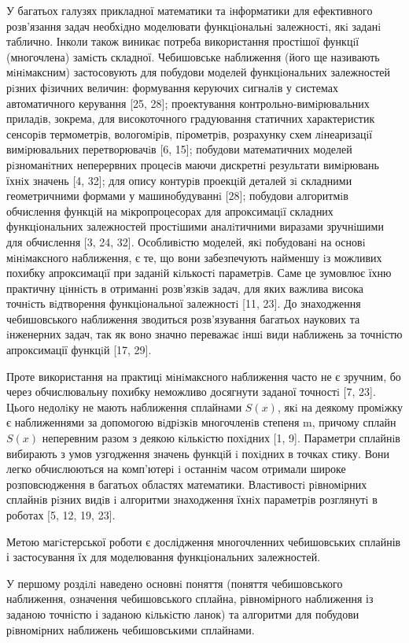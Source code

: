 \documentclass[ukrainian,14pt]{extarticle}
\begin{document}
У багатьох галузях прикладної математики та iнформатики для
ефективного розв’язання задач необхiдно моделювати функцiональнi
залежностi, якi заданi таблично. Інколи також виникає потреба
використання простішої функцiї (многочлена) замiсть складної.
Чебишовське наближення (його ще називають мiнiмаксним) застосовують
для побудови моделей функцiональних залежностей рiзних фiзичних
величин: формування керуючих сигналiв у системах автоматичного
керування [25, 28]; проектування контрольно-вимiрювальних приладiв,
зокрема, для високоточного градуювання статичних характеристик
сенсорiв термометрiв, вологомiрiв, пiрометрiв, розрахунку схем
лiнеаризацiї вимiрювальних перетворювачiв [6, 15]; побудови
математичних моделей рiзноманiтних неперервних процесiв маючи
дискретнi результати вимiрювань їхнiх значень [4, 32]; для опису контурiв
проекцiй деталей зi складними геометричними формами у
машинобудуваннi [28]; побудови алгоритмiв обчислення функцiй на
мiкропроцесорах для апроксимацiї складних функцiональних залежностей
простiшими аналiтичними виразами зручнiшими для обчислення [3, 24, 32]. Особливiстю моделей, якi побудованi на основi мiнiмаксного
наближення, є те, що вони забезпечують найменшу iз можливих похибку апроксимацiї при заданiй кiлькостi параметрiв. 
Саме це зумовлює їхню практичну цiннiсть в отриманнi розв’язкiв задач, для яких важлива висока точнiсть вiдтворення функцiональної залежностi [11, 23]. 
До знаходження чебишовського наближення зводиться розв’язування багатьох наукових та iнженерних задач, так як воно значно переважає iншi види наближень за точністю апроксимації функцiй [17, 29]. 

Проте використання на практицi мiнiмаксного наближення часто не є зручним, бо через обчислювальну похибку неможливо досягнути заданої
точностi [7, 23]. 
Цього недолiку не мають наближення сплайнами $S(x)$, якi на деякому промiжку є наближеннями за допомогою вiдрiзкiв многочленiв
степеня m, причому сплайн $S(x)$ неперевним разом з деякою кiлькiстю похiдних [1, 9]. 
Параметри сплайнiв вибирають з умов узгодження
значень функцiй i похiдних в точках стику. Вони легко обчислюються на комп’ютерi i останнiм часом отримали широке розповсюдження в багатьох областях математики. 
Властивостi рiвномiрних сплайнiв рiзних
видiв i алгоритми знаходження їхнiх параметрiв розглянутi в роботах [5, 12, 19, 23].

Метою магiстерської роботи є дослідження многочленних чебишовських сплайнів і застосування їх для моделювання функцiональних залежностей.

У першому роздiлi наведено основнi поняття (поняття чебишовського наближення, означення чебишовського сплайна, рівномірного наближення
із заданою точністю і заданою кiлькiстю ланок) та алгоритми для побудови рiвномiрних наближень чебишовськими сплайнами.
\end{document}
